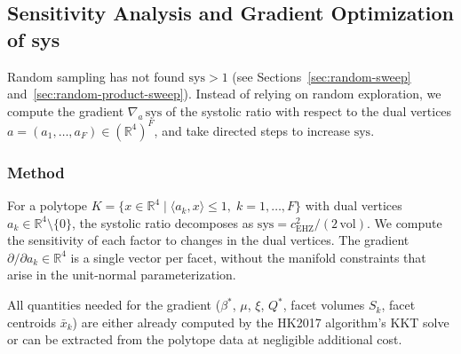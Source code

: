 %
%
%

\subsection{Sensitivity Analysis and Gradient Optimization of sys}
\label{sec:sys-optimization}

Random sampling has not found $\mathrm{sys} > 1$ (see
Sections~\ref{sec:random-sweep} and~\ref{sec:random-product-sweep}).
Instead of relying on random exploration, we compute the gradient
$\nabla_a\,\mathrm{sys}$ of the systolic ratio with respect to
the dual vertices $a = (a_1,\dots,a_F) \in (\mathbb{R}^4)^F$,
and take directed steps to increase $\mathrm{sys}$.

\subsubsection*{Method}

For a polytope $K = \{x \in \mathbb{R}^4 \mid \langle a_k, x \rangle \le 1,\; k=1,\dots,F\}$
with dual vertices $a_k \in \mathbb{R}^4 \setminus \{0\}$,
the systolic ratio decomposes as
$\mathrm{sys} = c_{\mathrm{EHZ}}^2 / (2\,\mathrm{vol})$.
We compute the sensitivity of each factor to changes in the dual vertices.
The gradient $\partial/\partial a_k \in \mathbb{R}^4$ is a single vector
per facet, without the manifold constraints that arise in the unit-normal
parameterization.

All quantities needed for the gradient ($\beta^*$, $\mu$, $\xi$, $Q^*$,
facet volumes $S_k$, facet centroids $\bar{x}_k$) are either already computed
by the HK2017 algorithm's KKT solve or can be extracted from the polytope data
at negligible additional cost.

